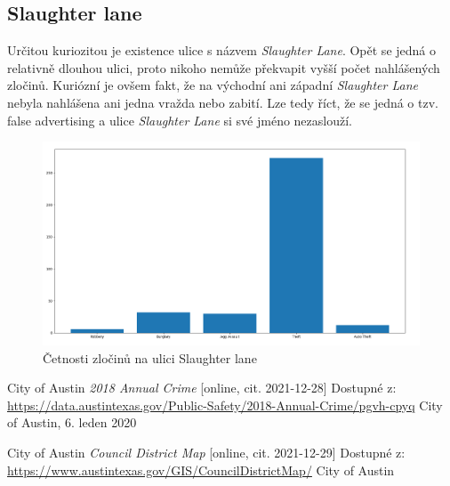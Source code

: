 \documentclass{article}
\begin{document}
\subsection{Slaughter lane}

Určitou kuriozitou je existence ulice s názvem \emph{Slaughter Lane}. Opět se jedná o relativně dlouhou ulici,
proto nikoho nemůže překvapit vyšší počet nahlášených zločinů. Kuriózní je ovšem fakt, že na východní ani západní
\emph{Slaughter Lane} nebyla nahlášena ani jedna vražda nebo zabití. Lze tedy říct, že se jedná o tzv.
false advertising a ulice \emph{Slaughter Lane} si své jméno nezaslouží.

\begin{figure}
  \centering
  \includegraphics[width=1.4\textwidth]{figures/slaughter_lane.png}
  \caption{Četnosti zločinů na ulici Slaughter lane}
\end{figure}

\begin{thebibliography}{50}

City of Austin \textit{2018 Annual Crime} [online, cit. 2021-12-28]
Dostupné z: \url{https://data.austintexas.gov/Public-Safety/2018-Annual-Crime/pgvh-cpyq} 
City of Austin, 6. leden 2020

City of Austin \textit{Council District Map} [online, cit. 2021-12-29]
Dostupné z: \url{https://www.austintexas.gov/GIS/CouncilDistrictMap/} 
City of Austin

\end{thebibliography}
\end{document}
